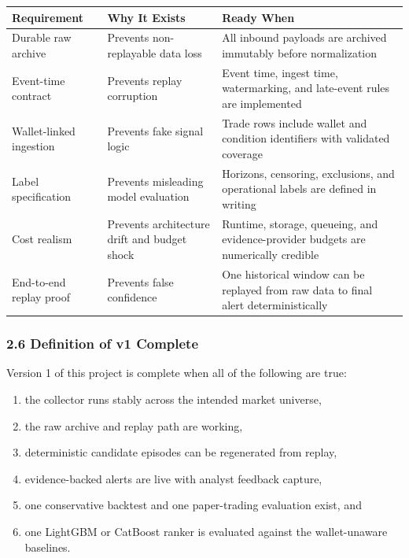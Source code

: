 \documentclass[
]{article}
\newcounter{none} %
\providecommand{\tightlist}{%
  \setlength{\itemsep}{0pt}\setlength{\parskip}{0pt}}
\begin{document}
{\def\LTcaptype{none} %
\begin{longtable}[]{@{}lll@{}}
\toprule\noalign{}
Requirement & Why It Exists & Ready When \\
\midrule\noalign{}
\endhead
\bottomrule\noalign{}
\endlastfoot
Durable raw archive & Prevents non-replayable data loss & All inbound
payloads are archived immutably before normalization \\
Event-time contract & Prevents replay corruption & Event time, ingest
time, watermarking, and late-event rules are implemented \\
Wallet-linked ingestion & Prevents fake signal logic & Trade rows include
wallet and condition identifiers with validated coverage \\
Label specification & Prevents misleading model evaluation & Horizons,
censoring, exclusions, and operational labels are defined in writing \\
Cost realism & Prevents architecture drift and budget shock & Runtime,
storage, queueing, and evidence-provider budgets are numerically
credible \\
End-to-end replay proof & Prevents false confidence & One historical
window can be replayed from raw data to final alert deterministically \\
\end{longtable}
}

\subsubsection{2.6 Definition of v1 Complete}\label{26-definition-of-v1-complete}

Version 1 of this project is complete when all of the following are
true:

\begin{enumerate}
\def\labelenumi{\arabic{enumi}.}
\tightlist
\item
  the collector runs stably across the intended market universe,
\item
  the raw archive and replay path are working,
\item
  deterministic candidate episodes can be regenerated from replay,
\item
  evidence-backed alerts are live with analyst feedback capture,
\item
  one conservative backtest and one paper-trading evaluation exist, and
\item
  one LightGBM or CatBoost ranker is evaluated against the wallet-unaware
  baselines.
\end{enumerate}
\end{document}
